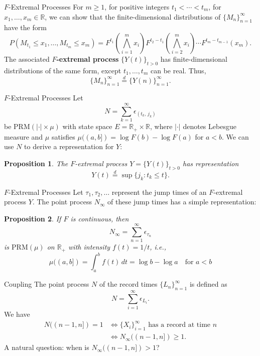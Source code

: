 \documentclass{beamer}
\newcommand{\PRM}{\text{PRM}}
\newtheorem{proposition}{Proposition}
\begin{document}
\begin{frame}{$F$-Extremal Processes}
    For $m \ge 1$, for positive integers $t_1 < \cdots < t_m$, for $x_1, \ldots, x_m \in \mathbb{R}$, we can show that the finite-dimensional distributions of $\{M_n\}_{n = 1}^{\infty}$ have the form
    \[
    P(M_{t_1} \le x_1, \ldots, M_{t_m} \le x_m) = F^{t_1}\left(\bigwedge_{i = 1}^m x_i\right)F^{t_2 - t_1}\left(\bigwedge_{i = 2}^m x_i\right) \cdots F^{t_m - t_{m - 1}}\left(x_m\right).
    \]
    The associated \textbf{$F$-extremal process} $\{Y(t)\}_{t > 0}$ has finite-dimensional distributions of the same form, except $t_1, \ldots, t_m$ can be real. Thus,
    \[
    \{M_n\}_{n = 1}^{\infty} \overset{d}{=} \{Y(n)\}_{n = 1}^{\infty}.
    \]
\end{frame}

\begin{frame}{$F$-Extremal Processes}
    Let
    \[
    N = \sum_{k = 1}^{\infty} \epsilon_{(t_k,\,j_k)}
    \]
    be $\PRM(|\cdot| \times \mu)$ with state space $E = \mathbb{R}_+ \times \mathbb{R}$, where $|\cdot|$ denotes Lebesgue measure and $\mu$ satisfies $\mu((a, b]) = \log F(b) - \log F(a)$ for $a < b$. We can use $N$ to derive a representation for $Y$:
    \begin{proposition}
        The $F$-extremal process $Y = \{Y(t)\}_{t > 0}$ has representation
        \[
        Y(t) \overset{d}{=} \sup\{j_k : t_k \le t\}.
        \]
    \end{proposition}
\end{frame}

\begin{frame}{$F$-Extremal Processes}
    Let $\tau_1, \tau_2, \ldots$ represent the jump times of an $F$-extremal process $Y$. The point process $N_{\infty}$ of these jump times has a simple representation:
    \begin{proposition}
        If $F$ is continuous, then
        \[
        N_{\infty} = \sum_{n = 1}^{\infty} \epsilon_{\tau_n}
        \]
        is $\PRM(\mu)$ on $\mathbb{R}_+$ with intensity $f(t) = 1 / t$, i.e.,
        \[
        \mu((a, b]) = \int_a^b f(t)\,dt = \log b - \log a \quad \text{for $a < b$}
        \]
    \end{proposition}
\end{frame}

\begin{frame}{Coupling}
    The point process $N$ of the record times $\{L_n\}_{n = 1}^{\infty}$ is defined as
    \[
    N = \sum_{i = 1}^{\infty} \epsilon_{L_i}.
    \]
    We have
    \begin{align*}
        N((n - 1, n]) = 1 &\iff \text{$\{X_i\}_{i = 1}^{\infty}$ has a record at time $n$} \\
        &\iff N_{\infty}((n - 1, n]) \ge 1.
    \end{align*}
    A natural question: when is $N_{\infty}((n - 1, n]) > 1$?
\end{frame}
\end{document}
